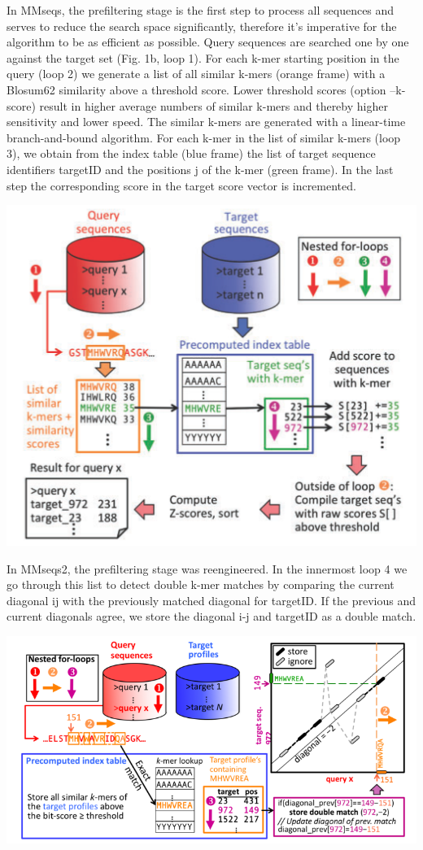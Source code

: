 In MMseqs, the prefiltering stage is the first step to process all sequences and serves to reduce the search space significantly, therefore it's imperative for the algorithm to be as efficient as possible. Query sequences are searched one by one against the target set (Fig. 1b, loop 1). For each k-mer starting position in the query (loop 2) we generate a list of all similar k-mers (orange frame) with a Blosum62 similarity above a threshold score. Lower threshold scores (option --k-score) result in higher average numbers of similar k-mers and thereby higher sensitivity and lower speed. The similar k-mers are generated with a linear-time branch-and-bound algorithm. For each k-mer in the list of similar k-mers (loop 3), we obtain from the index table (blue frame) the list of target sequence identiﬁers targetID and the positions j of the k-mer (green frame). In the last step the corresponding score in the target score vector is incremented.

\begin{center}
\includegraphics[scale=0.3]{graphics/MMseqs_prefilter.png}
\end{center}

In MMseqs2, the prefiltering stage was reengineered. In the innermost loop 4 we go through this list to detect double k-mer matches by comparing the current diagonal ij with the previously matched diagonal for targetID. If the previous and current diagonals agree, we store the diagonal i-j and targetID as a double match.

\begin{center}
\includegraphics[scale=0.5]{graphics/MMseqs2_prefilter.png}
\end{center}

